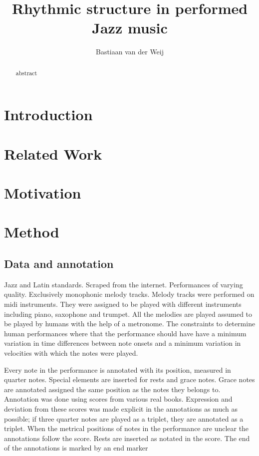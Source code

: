 \documentclass[a4paper,10pt]{article}
\title{Rhythmic structure in performed Jazz music}
\author{Bastiaan van der Weij}
\begin{document}
\maketitle
\begin{abstract}
abstract
\end{abstract}
\section{Introduction}
\label{sec:introduction}

\section{Related Work}
\label{sec:relatedwork}

\section{Motivation}
\label{sec:motivation}

\section{Method}
\label{sec:method}

\subsection{Data and annotation}

Jazz and Latin standards. Scraped from the internet. Performances of varying quality. Exclusively monophonic melody tracks. Melody tracks were performed on midi instruments. They were assigned to be played with different instruments including piano, saxophone and trumpet. All the melodies are played assumed to be played by humans with the help of a metronome. The constraints to determine human performances where that the performance should have have a minimum variation in time differences between note onsets and a minimum variation in velocities with which the notes were played.

Every note in the performance is annotated with its position, measured in quarter notes. Special elements are inserted for rests and grace notes. Grace notes are annotated assigned the same position as the notes they belongs to. Annotation was done using scores from various real books. Expression and deviation from these scores was made explicit in the annotations as much as possible; if three quarter notes are played as a triplet, they are annotated as a triplet. When the metrical positions of notes in the performance are unclear the annotations follow the score. Rests are inserted as notated in the score. The end of the annotations is marked by an end marker
\end{document}
